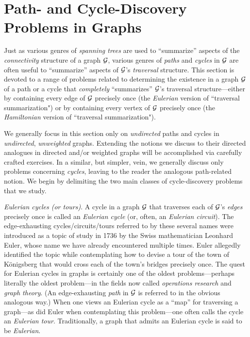 \section{Path- and Cycle-Discovery Problems in Graphs}
\label{sec:path-cycle-problems}

Just as various genres of {\it spanning trees} are used to ``summarize'' aspects of the {\em connectivity} structure of a  graph $\mbox{$\cal G$}$, various genres of {\it paths} and {\it cycles} in $\mbox{$\cal G$}$ are often useful to ``summarize'' aspects of $\mbox{$\cal G$}$'s {\em traversal} structure.  This section is devoted to a range of problems related to determining the existence in a graph $\mbox{$\cal G$}$ of a path or a cycle that {\em completely} ``summarizes'' $\mbox{$\cal G$}$'s traversal structure---either by containing every edge of $\mbox{$\cal G$}$ precisely once (the {\it Eulerian} version of ``traversal summarization") or by containing every vertex of $\mbox{$\cal G$}$ precisely once (the {\it Hamiltonian} version of ``traversal summarization").

We generally focus in this section only on {\em undirected} paths and cycles in {\em undirected}, {\em unweighted} graphs.  Extending the notions we discuss to their directed analogues in directed and/or weighted graphs will be accomplished via carefully crafted exercises.  In a similar, but simpler, vein, we generally discuss only problems concerning {\em cycles}, leaving to the reader the analogous path-related notion.  We begin by delimiting the two main classes of cycle-discovery problems that we study.

\bigskip

 
   

{\it Eulerian cycles (or tours)}.
A cycle in a graph $\mbox{$\cal G$}$ that traverses each of $\mbox{$\cal G$}$'s {\em edges} precisely once is called an {\it Eulerian cycle} (or, often, an {\it Eulerian circuit}).  The edge-exhausting cycles/circuits/tours referred to by these several names were introduced as a topic of study in 1736 by the Swiss mathematician Leonhard Euler, whose name we have already encountered multiple times.  Euler allegedly identified the topic while contemplating how to devise a tour of the town of K\"{o}nigsberg that would cross each of the town's bridges precisely once.  The quest for Eulerian cycles in graphs is certainly one of the oldest problems---perhaps literally the oldest problem---in the fields now called {\it operations research} and {\it graph theory}.  (An edge-exhausting {\em path} in $\mbox{$\cal G$}$ is referred to in the obvious analogous way.)  When one views an Eulerian cycle as a ``map'' for traversing a graph---as did Euler when contemplating this problem---one often calls the cycle an {\it Eulerian tour}.  Traditionally, a graph that admits an Eulerian cycle is said to be {\it Eulerian}. 
    
 

